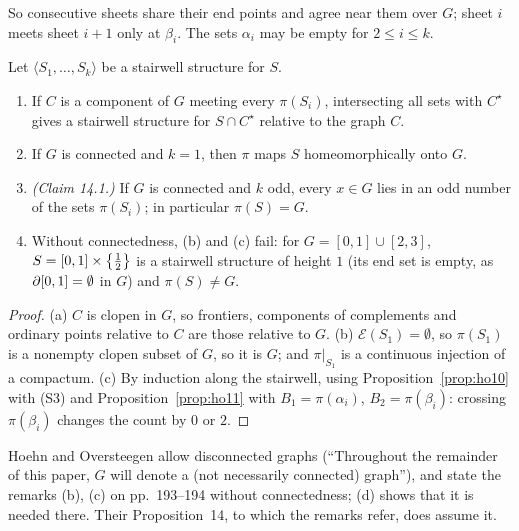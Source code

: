 
So consecutive sheets share their end points and agree near them over $G$; sheet $i$ meets sheet $i+1$ only at $\beta_i$. The sets $\alpha_i$ may be empty for
$2\le i\le k$.

\begin{proposition}[remarks on pp.~193--194]\label{prop:stair-remarks}
Let $\langle S_1,\dots,S_k\rangle$ be a stairwell structure for $S$.
\begin{enumerate}[label=(\alph*)]
\item If $C$ is a component of $G$ meeting every $\pi(S_i)$, intersecting all sets with $C^\star$ gives a stairwell structure for $S\cap C^\star$ relative to the graph $C$.
\item If $G$ is connected and $k=1$, then $\pi$ maps $S$ homeomorphically onto $G$.
\item \emph{(Claim 14.1.)} If $G$ is connected and $k$ odd, every $x\in G$ lies in an odd number of the sets $\pi(S_i)$; in particular $\pi(S)=G$.
\item Without connectedness, (b) and (c) fail: for $G=[0,1]\cup[2,3]$, $S=[0,1]\times\left\{ \frac12 \right\}$ is a stairwell structure of height $1$ (its end set is empty, as $\partial[0,1]=\emptyset$ in
$G$) and $\pi(S)\neq G$.
\end{enumerate}
\end{proposition}

\begin{proof}
(a) $C$ is clopen in $G$, so frontiers, components of complements and ordinary points relative to $C$ are those relative to $G$. (b) $\mathcal E(S_1)=\emptyset$, so
$\pi(S_1)$ is a nonempty clopen subset of $G$, so it is $G$; and $\pi|_{S_1}$ is a continuous injection of a compactum. (c) By induction along the stairwell, using
Proposition~\ref{prop:ho10} with (S3) and Proposition~\ref{prop:ho11} with $B_1=\pi(\alpha_i)$, $B_2=\pi(\beta_i)$: crossing $\pi(\beta_i)$ changes the count by $0$ or $2$.
\end{proof}


Hoehn and Oversteegen allow disconnected graphs (``Throughout the remainder of this paper, $G$ will denote a (not necessarily connected) graph''), and state the
remarks (b), (c) on pp.~193--194 without connectedness; (d) shows that it is needed there. Their Proposition~14, to which the remarks refer, does assume it.


